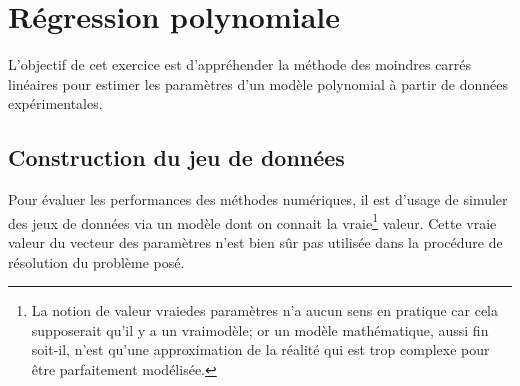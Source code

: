 \chapter{Régression polynomiale}

L'objectif de cet exercice est d'appréhender la méthode des moindres carrés linéaires pour estimer les paramètres d'un modèle polynomial à partir de données expérimentales.

\section{Construction du jeu de données}

Pour évaluer les performances des méthodes numériques, il est d'usage de simuler des jeux de données via un modèle dont on connait la \guillemotleft vraie\guillemotright\footnote{La notion de valeur \guillemotleft vraie\guillemotright des paramètres n'a aucun sens en pratique car cela supposerait qu'il y a un \guillemotleft vrai\guillemotright modèle; or un modèle mathématique, aussi fin soit-il, n'est qu'une approximation de la réalité qui est trop complexe pour être parfaitement modélisée.} valeur. Cette \guillemotleft vraie\guillemotright\, valeur du vecteur des paramètres n'est bien sûr pas utilisée dans la procédure de résolution du problème posé.

